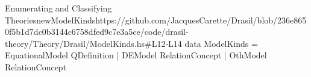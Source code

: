 \begin{haskell}{Enumerating and Classifying Theories}{newModelKinds}{https://github.com/JacquesCarette/Drasil/blob/236e8650f5b1d7dc0b3144c6758dfed9c7e3a5ce/code/drasil-theory/Theory/Drasil/ModelKinds.hs\#L12-L14}
data ModelKinds = EquationalModel QDefinition
                | DEModel RelationConcept
                | OthModel RelationConcept
\end{haskell}
